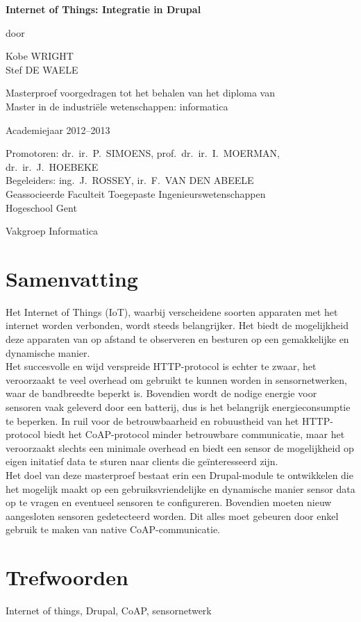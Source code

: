 
\newpage

{
\setlength{\baselineskip}{14pt}
\setlength{\parindent}{0pt}
\setlength{\parskip}{8pt}

\begin{center}

\noindent \textbf{\huge
Internet of Things: Integratie in Drupal
}

door 

Kobe WRIGHT\\
Stef DE WAELE

Masterproef voorgedragen tot het behalen van het diploma van\\
Master in de industri\"{e}le wetenschappen: informatica

Academiejaar 2012--2013

Promotoren: dr.~ir.~P.~SIMOENS, prof.~dr.~ir.~I.~MOERMAN, dr.~ir.~J.~HOEBEKE\\
Begeleiders: ing.~J.~ROSSEY, ir.~F.~VAN DEN ABEELE\\

Geassocieerde Faculteit Toegepaste Ingenieurswetenschappen\\
Hogeschool Gent

Vakgroep Informatica

\end{center}

\section*{Samenvatting}


Het Internet of Things (IoT), waarbij verscheidene soorten apparaten met het internet worden verbonden, wordt steeds belangrijker. Het biedt de mogelijkheid deze apparaten van op afstand te observeren en besturen op een gemakkelijke en dynamische manier.\\
Het succesvolle en wijd verspreide HTTP-protocol is echter te zwaar, het veroorzaakt te veel overhead om gebruikt te kunnen worden in sensornetwerken, waar de bandbreedte beperkt is. Bovendien wordt de nodige energie voor sensoren vaak geleverd door een batterij, dus is het belangrijk energieconsumptie te beperken. In ruil voor de betrouwbaarheid en robuustheid van het HTTP-protocol biedt het CoAP-protocol minder betrouwbare communicatie, maar het veroorzaakt slechts een minimale overhead en biedt een sensor de mogelijkheid op eigen initatief data te sturen naar clients die ge\"{i}nteresseerd zijn.\\
Het doel van deze masterproef bestaat erin een Drupal-module te ontwikkelen die het mogelijk maakt op een gebruiksvriendelijke en dynamische manier sensor data op te vragen en eventueel sensoren te configureren. Bovendien moeten nieuw aangesloten sensoren gedetecteerd worden. Dit alles moet gebeuren door enkel gebruik te maken van native CoAP-communicatie. 


\section*{Trefwoorden}


Internet of things, Drupal, CoAP, sensornetwerk

}

\newpage %
